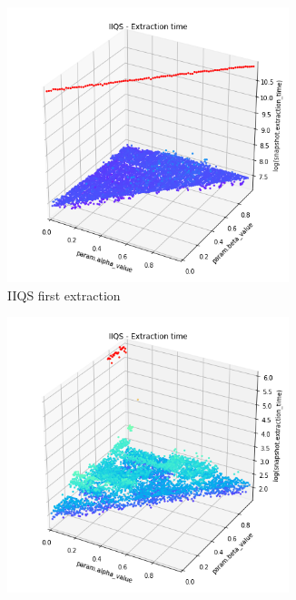 \begin{figure}
    \centering
    \begin{subfigure}[b]{0.45\textwidth}
        \centering
        \includegraphics[width=0.9\textwidth]{./fragments/04_experimental_execution/images/04_alphabeta_noclass_desc.png.1_0.png}
        \caption{IIQS first extraction}
        \label{FIG:05_ALPHABETA_RELATIONSHIP_DESC__0_0}
    \end{subfigure}
    \hfill
    \begin{subfigure}[b]{0.45\textwidth}
        \centering
        \includegraphics[width=0.9\textwidth]{./fragments/04_experimental_execution/images/04_alphabeta_noclass_desc.png.0_0.png}

\end{subfigure}
\end{figure}
